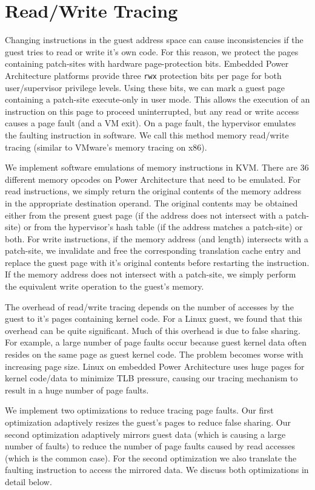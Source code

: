 \documentclass[10pt,twocolumn]{article}
\begin{document}
\section{Read/Write Tracing}
\label{sec:tracing}
Changing instructions in the guest address space can cause
inconsistencies if the guest tries to read or write it's own code.
For this reason, we protect the pages containing patch-sites with hardware
page-protection bits. Embedded Power Architecture platforms provide three {\tt rwx}
protection bits per page for both user/supervisor privilege levels. Using these
bits, we can mark a guest page containing a patch-site
execute-only in user mode. This allows the
execution of an instruction on this page to proceed uninterrupted,
but any read or write access causes a page fault (and a VM exit).
On a page fault, the hypervisor
emulates the faulting instruction in software. We call this
method memory read/write tracing (similar to VMware's memory tracing
on x86\cite{adams:asplos06}).

We implement software emulations of memory instructions in KVM. There are 36
different memory opcodes on Power Architecture that need to be emulated.
For read instructions, we simply return the original contents of the memory
address in the appropriate destination
operand. The original contents may be obtained either from the present guest
page (if the address does not intersect with a patch-site) or from the hypervisor's
hash table (if the address matches a patch-site) or both.
For write instructions, if the memory address (and length) intersects with a patch-site,
we invalidate and free the corresponding translation cache
entry and replace the guest page with it's original contents before
restarting the instruction. If the memory address does not intersect with a
patch-site, we simply perform the equivalent write operation to the guest's memory.

The overhead of read/write tracing depends on the number of accesses by the guest
to it's pages containing kernel code. For a Linux guest, we found that this overhead
can be quite significant.
Much of this overhead is due to false sharing. For example, a large number of page
faults occur because guest kernel data often resides on the same page as
guest kernel code. The problem becomes worse with increasing page size. Linux
on embedded
Power Architecture uses huge pages for kernel code/data to minimize
TLB pressure, causing our tracing mechanism to result in a huge number of page
faults.

We implement two optimizations to reduce tracing page faults. Our first optimization
adaptively resizes the guest's pages to reduce false sharing.
Our second optimization adaptively
mirrors guest data (which is causing a large number of faults) to reduce the number
of page faults caused by read accesses (which is the common case). For the second
optimization we also translate the faulting instruction to access the mirrored data.
We discuss both optimizations in detail below.
\end{document}
